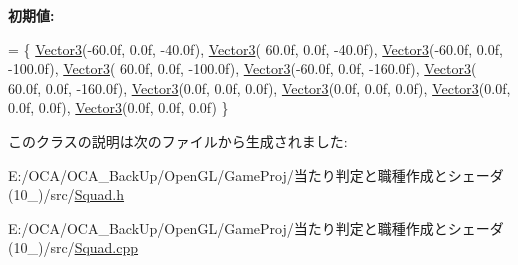 {\bfseries 初期値\-:}
\begin{DoxyCode}
=
\{
    \hyperlink{struct_vector3}{Vector3}(-60.0f, 0.0f,  -40.0f),      
    \hyperlink{struct_vector3}{Vector3}( 60.0f, 0.0f,  -40.0f),      
    \hyperlink{struct_vector3}{Vector3}(-60.0f, 0.0f, -100.0f),      
    \hyperlink{struct_vector3}{Vector3}( 60.0f, 0.0f, -100.0f),      
    \hyperlink{struct_vector3}{Vector3}(-60.0f, 0.0f, -160.0f),      
    \hyperlink{struct_vector3}{Vector3}( 60.0f, 0.0f, -160.0f),      
    \hyperlink{struct_vector3}{Vector3}(0.0f, 0.0f, 0.0f),       
    \hyperlink{struct_vector3}{Vector3}(0.0f, 0.0f, 0.0f),       
    \hyperlink{struct_vector3}{Vector3}(0.0f, 0.0f, 0.0f),       
    \hyperlink{struct_vector3}{Vector3}(0.0f, 0.0f, 0.0f)        
\}
\end{DoxyCode}


このクラスの説明は次のファイルから生成されました\-:\begin{DoxyCompactItemize}
\item 
E\-:/\-O\-C\-A/\-O\-C\-A\-\_\-\-Back\-Up/\-Open\-G\-L/\-Game\-Proj/当たり判定と職種作成とシェーダ(10\-\_)/src/\hyperlink{_squad_8h}{Squad.\-h}\item 
E\-:/\-O\-C\-A/\-O\-C\-A\-\_\-\-Back\-Up/\-Open\-G\-L/\-Game\-Proj/当たり判定と職種作成とシェーダ(10\-\_)/src/\hyperlink{_squad_8cpp}{Squad.\-cpp}\end{DoxyCompactItemize}
